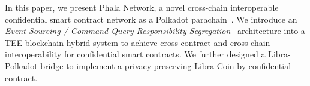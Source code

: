 
In this paper, we present Phala Network, a novel cross-chain interoperable confidential smart contract network as a Polkadot parachain~\cite{wood2016polkadot}. We introduce an \textit{Event Sourcing / Command Query Responsibility Segregation}~\cite{eventsourcing, cqrs} architecture into a TEE-blockchain hybrid system to achieve cross-contract and cross-chain interoperability for confidential smart contracts. We further designed a Libra-Polkadot bridge to implement a privacy-preserving Libra Coin by confidential contract.
